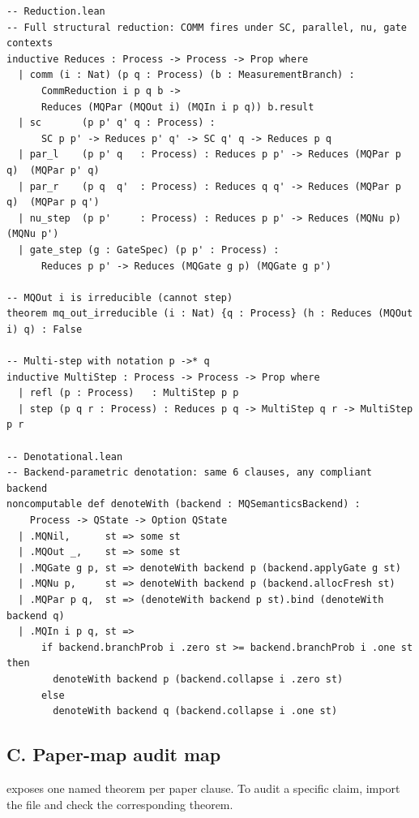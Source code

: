 \documentclass[11pt]{article}
\newcommand{\codepath}[1]{\path{#1}}
\begin{document}
\begin{lstlisting}[language={},caption={Reduction (\texttt{Reduction.lean}) and denotation (\texttt{Denotational.lean})}]
-- Reduction.lean
-- Full structural reduction: COMM fires under SC, parallel, nu, gate contexts
inductive Reduces : Process -> Process -> Prop where
  | comm (i : Nat) (p q : Process) (b : MeasurementBranch) :
      CommReduction i p q b ->
      Reduces (MQPar (MQOut i) (MQIn i p q)) b.result
  | sc       (p p' q' q : Process) :
      SC p p' -> Reduces p' q' -> SC q' q -> Reduces p q
  | par_l    (p p' q   : Process) : Reduces p p' -> Reduces (MQPar p q)  (MQPar p' q)
  | par_r    (p q  q'  : Process) : Reduces q q' -> Reduces (MQPar p q)  (MQPar p q')
  | nu_step  (p p'     : Process) : Reduces p p' -> Reduces (MQNu p)     (MQNu p')
  | gate_step (g : GateSpec) (p p' : Process) :
      Reduces p p' -> Reduces (MQGate g p) (MQGate g p')

-- MQOut i is irreducible (cannot step)
theorem mq_out_irreducible (i : Nat) {q : Process} (h : Reduces (MQOut i) q) : False

-- Multi-step with notation p ->* q
inductive MultiStep : Process -> Process -> Prop where
  | refl (p : Process)   : MultiStep p p
  | step (p q r : Process) : Reduces p q -> MultiStep q r -> MultiStep p r

-- Denotational.lean
-- Backend-parametric denotation: same 6 clauses, any compliant backend
noncomputable def denoteWith (backend : MQSemanticsBackend) :
    Process -> QState -> Option QState
  | .MQNil,      st => some st
  | .MQOut _,    st => some st
  | .MQGate g p, st => denoteWith backend p (backend.applyGate g st)
  | .MQNu p,     st => denoteWith backend p (backend.allocFresh st)
  | .MQPar p q,  st => (denoteWith backend p st).bind (denoteWith backend q)
  | .MQIn i p q, st =>
      if backend.branchProb i .zero st >= backend.branchProb i .one st then
        denoteWith backend p (backend.collapse i .zero st)
      else
        denoteWith backend q (backend.collapse i .one st)
\end{lstlisting}

\subsection*{C. Paper-map audit map}

\codepath{PaperMap.lean} exposes one named theorem per paper clause.
To audit a specific claim, import the file and check the corresponding theorem.
\end{document}
